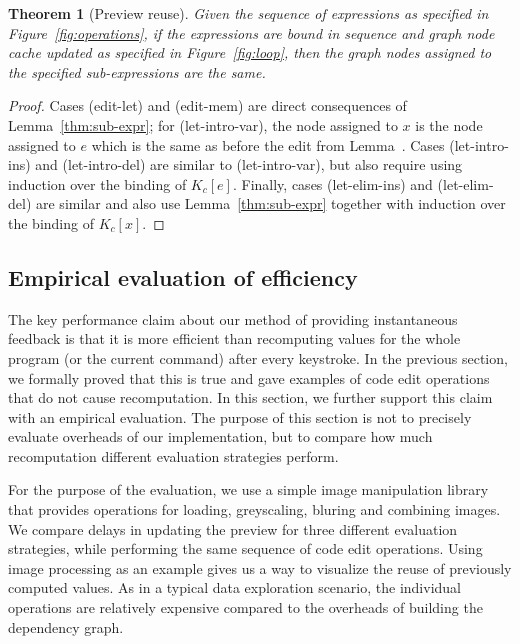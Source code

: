 \documentclass[acmsmall,anonymous,fleqn]{acmart}\settopmatter{printfolios=false,printccs=false,printacmref=false}
\newcounter{thc}
\theoremstyle{plain}
\newtheorem{theorem}[thc]{Theorem}
\theoremstyle{definition}
\newcommand{\rname}[1]{{\sffamily\small(#1)}}
\begin{document}
\begin{theorem}[Preview reuse]
\label{thm:preview-reuse}
Given the sequence of expressions as specified in Figure~\ref{fig:operations}, if the expressions
are bound in sequence and graph node cache updated as specified in Figure~\ref{fig:loop}, then
the graph nodes assigned to the specified sub-expressions are the same.
\end{theorem}
\begin{proof}
Cases \rname{edit-let} and \rname{edit-mem} are direct consequences of Lemma~\ref{thm:sub-expr};
for \rname{let-intro-var}, the node assigned to $x$ is the node assigned to $e$ which is the
same as before the edit from Lemma~.
Cases \rname{let-intro-ins} and \rname{let-intro-del} are similar to \rname{let-intro-var}, but
also require using induction over the binding of $K_c[e]$. Finally, cases \rname{let-elim-ins}
and \rname{let-elim-del} are similar and also use Lemma~\ref{thm:sub-expr}
together with induction over the binding of $K_c[x]$.
\end{proof}


\subsection{Empirical evaluation of efficiency}
\label{sec:evaluation-empirical}

The key performance claim about our method of providing instantaneous feedback is that it is more
efficient than recomputing values for the whole program (or the current command) after every
keystroke. In the previous section, we formally proved that this is true and gave examples of
code edit operations that do not cause recomputation. In this section, we further support this
claim with an empirical evaluation. The purpose of this section is not to precisely evaluate
overheads of our implementation, but to compare how much recomputation different evaluation
strategies perform.

For the purpose of the evaluation, we use a simple image manipulation library that provides
operations for loading, greyscaling, bluring and combining images. We compare delays in
updating the preview for three different evaluation strategies, while performing the same
sequence of code edit operations. Using image processing as an example gives us a way to
visualize the reuse of previously computed values. As in a typical data exploration scenario,
the individual operations are relatively expensive compared to the overheads of building the
dependency graph.
\end{document}
